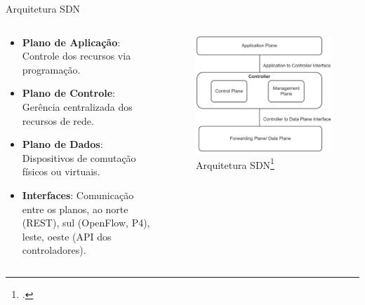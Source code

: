 \begin{frame}{Arquitetura SDN}
    \begin{columns}
        \begin{column}{0.55\textwidth}
            \begin{itemize}
                \item \textbf{Plano de Aplicação}: Controle dos recursos via programação.
                \item \textbf{Plano de Controle}: Gerência centralizada dos recursos de rede.
                \item \textbf{Plano de Dados}: Dispositivos de comutação físicos ou virtuais.
                \item \textbf{Interfaces}: Comunicação entre os planos, ao norte (REST), sul (OpenFlow, P4), leste, oeste (API dos controladores).
        \end{itemize}            
        \end{column}
        \begin{column}{0.45\textwidth}
            \vspace{1cm}
            \begin{figure}[h]
                \centering
                \includegraphics[width=\textwidth]{figs/SDN_arquitetura.png}
                \caption{Arquitetura SDN\footcite{Recommended_SDN_Wireless}}
            \end{figure}
        \end{column}
    \end{columns}
\end{frame}

